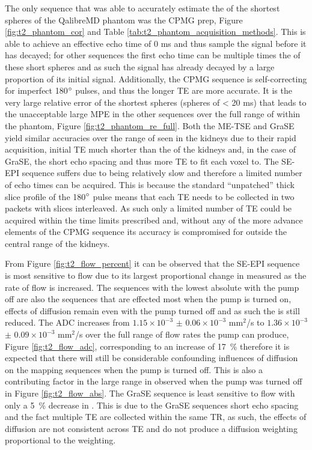 The only sequence that was able to accurately estimate the \ttwo of the shortest \ttwo spheres of the QalibreMD phantom was the \ac{CPMG} \ttwo prep, Figure \ref{fig:t2_phantom_cor} and Table \ref{tab:t2_phantom_acquisition_methods}. This is able to achieve an effective echo time of 0 ms and thus sample the signal before it has decayed; for other sequences the first echo time can be multiple times the \ttwo of these short spheres and as such the signal has already decayed by a large proportion of its initial signal. Additionally, the \ac{CPMG} sequence is self-correcting for imperfect 180$\degree$ pulses, and thus the longer \ac{TE} are more accurate. It is the very large relative error of the shortest \ttwo spheres (spheres of \ttwo < 20 ms) that leads to the unacceptable large \ac{MPE} in the other sequences over the full range of \ttwo within the phantom, Figure \ref{fig:t2_phantom_re_full}. Both the \ac{ME-TSE} and \ac{GraSE} yield similar accuracies over the range of \ttwo seen in the kidneys due to their rapid acquisition, initial \ac{TE} much shorter than the \ttwo of the kidneys and, in the case of \ac{GraSE}, the short echo spacing  and thus more \ac{TE} to fit each voxel to. The \ac{SE}-\ac{EPI} sequence suffers due to being relatively slow and therefore a limited number of echo times can be acquired. This is because the standard ``unpatched'' thick slice profile of the 180$\degree$ pulse means that each \ac{TE} needs to be collected in two packets with slices interleaved. As such only a limited number of \ac{TE} could be acquired within the time limits prescribed and, without any of the more advance elements of the \ac{CPMG} sequence its accuracy is compromised for \ttwo outside the central range of the kidneys. 

From Figure \ref{fig:t2_flow_percent} it can be observed that the \ac{SE}-\ac{EPI} sequence is most sensitive to flow due to its largest proportional change in measured \ttwo as the rate of flow is increased.  The sequences with the lowest absolute \ttwo with the pump off are also the sequences that are effected most when the pump is turned on, effects of diffusion remain even with the pump turned off and as such the \ttwo is still reduced. The \ac{ADC} increases from $1.15\times 10^{-3}$ $\pm$ $0.06\times 10^{-3}$ mm$^2$/s to $1.36\times 10^{-3}$ $\pm$ $0.09\times 10^{-3}$ mm$^2$/s over the full range of flow rates the pump can produce, Figure \ref{fig:t2_flow_adc}, corresponding to an increase of 17~\% therefore it is expected that there will still be considerable confounding influences of diffusion on the \ttwo mapping sequences when the pump is turned off. This is also a contributing factor in the large range in \ttwo observed when the pump was turned off in Figure \ref{fig:t2_flow_abs}. The \ac{GraSE} sequence is least sensitive to flow with only a 5~\% decrease in \ttwo. This is due to the \ac{GraSE} sequences short echo spacing and the fact multiple \ac{TE} are collected within the same \ac{TR}, as such, the effects of diffusion are not consistent across \ac{TE} and do not produce a diffusion weighting proportional to the \ttwo weighting.

